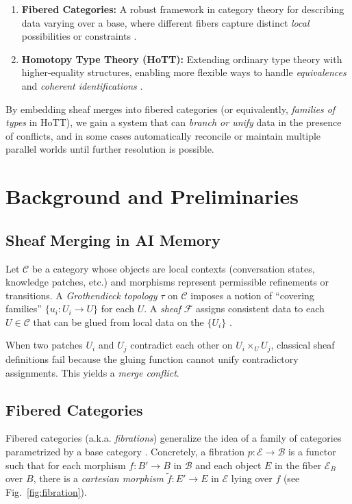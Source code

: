 \documentclass{article}
\begin{document}
\begin{enumerate}
    \item \textbf{Fibered Categories:} A robust framework in category theory for describing data varying over a base, where different fibers capture distinct \emph{local} possibilities or constraints \citep{grothendieck1971fibre, johnstone2002sketches}.
    \item \textbf{Homotopy Type Theory (HoTT):} Extending ordinary type theory with higher-equality structures, enabling more flexible ways to handle \emph{equivalences} and \emph{coherent identifications} \citep{hottbook}.
\end{enumerate}

By embedding sheaf merges into fibered categories (or equivalently, \emph{families of types} in HoTT), we gain a system that can \emph{branch or unify} data in the presence of conflicts, and in some cases automatically reconcile or maintain multiple parallel worlds until further resolution is possible.

\section{Background and Preliminaries}
\label{sec:background}

\subsection{Sheaf Merging in AI Memory}
Let $\mathcal{C}$ be a category whose objects are local contexts (conversation states, knowledge patches, etc.) and morphisms represent permissible refinements or transitions. A \emph{Grothendieck topology} $\tau$ on $\mathcal{C}$ imposes a notion of ``covering families'' $\{u_i: U_i \to U\}$ for each $U$. A \emph{sheaf} $\mathcal{F}$ assigns consistent data to each $U \in \mathcal{C}$ that can be glued from local data on the $\{U_i\}$ \citep{maclane1971categories}.

When two patches $U_i$ and $U_j$ contradict each other on $U_i \times_U U_j$, classical sheaf definitions fail because the gluing function cannot unify contradictory assignments. This yields a \emph{merge conflict}.

\subsection{Fibered Categories}
Fibered categories (a.k.a. \emph{fibrations}) generalize the idea of a family of categories parametrized by a base category \citep{grothendieck1971fibre}. Concretely, a fibration $p: \mathcal{E} \to \mathcal{B}$ is a functor such that for each morphism $f: B' \to B$ in $\mathcal{B}$ and each object $E$ in the fiber $\mathcal{E}_B$ over $B$, there is a \emph{cartesian morphism} $\widetilde{f}: E' \to E$ in $\mathcal{E}$ lying over $f$ (see Fig.~\ref{fig:fibration}).
\end{document}
